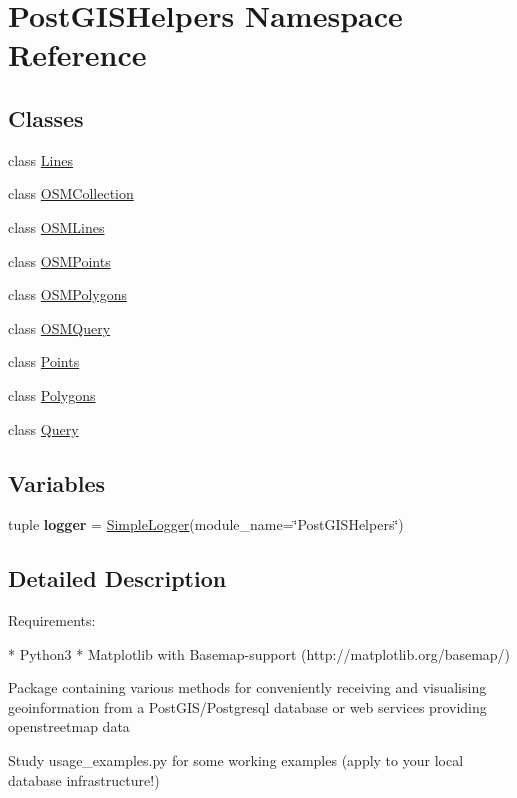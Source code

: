 \hypertarget{namespace_post_g_i_s_helpers}{}\section{Post\+G\+I\+S\+Helpers Namespace Reference}
\label{namespace_post_g_i_s_helpers}
\subsection*{Classes}
\begin{DoxyCompactItemize}
\item 
class \hyperlink{class_post_g_i_s_helpers_1_1_lines}{Lines}
\item 
class \hyperlink{class_post_g_i_s_helpers_1_1_o_s_m_collection}{O\+S\+M\+Collection}
\item 
class \hyperlink{class_post_g_i_s_helpers_1_1_o_s_m_lines}{O\+S\+M\+Lines}
\item 
class \hyperlink{class_post_g_i_s_helpers_1_1_o_s_m_points}{O\+S\+M\+Points}
\item 
class \hyperlink{class_post_g_i_s_helpers_1_1_o_s_m_polygons}{O\+S\+M\+Polygons}
\item 
class \hyperlink{class_post_g_i_s_helpers_1_1_o_s_m_query}{O\+S\+M\+Query}
\item 
class \hyperlink{class_post_g_i_s_helpers_1_1_points}{Points}
\item 
class \hyperlink{class_post_g_i_s_helpers_1_1_polygons}{Polygons}
\item 
class \hyperlink{class_post_g_i_s_helpers_1_1_query}{Query}
\end{DoxyCompactItemize}
\subsection*{Variables}
\begin{DoxyCompactItemize}
\item 
\hypertarget{namespace_post_g_i_s_helpers_a35221781bcc71b63ef13db443ee5290b}{}tuple {\bfseries logger} = \hyperlink{classsimple__log_1_1_simple_logger}{Simple\+Logger}(module\+\_\+name=\char`\"{}Post\+G\+I\+S\+Helpers\char`\"{})\label{namespace_post_g_i_s_helpers_a35221781bcc71b63ef13db443ee5290b}

\end{DoxyCompactItemize}


\subsection{Detailed Description}
\begin{DoxyVerb}Requirements:

* Python3
* Matplotlib with Basemap-support (http://matplotlib.org/basemap/)

Package containing various methods for conveniently receiving and visualising
geoinformation from a PostGIS/Postgresql database or web services providing
openstreetmap data

Study usage_examples.py for some working examples (apply to your local database
infrastructure!)
\end{DoxyVerb}
 